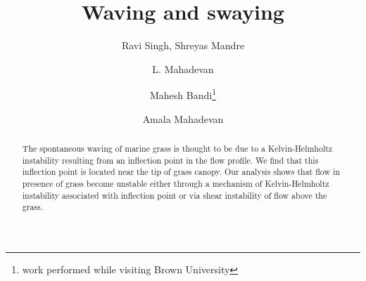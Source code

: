 \documentclass[aps,twocolumn,floatfix,prl,10pt]{revtex4-1}
\begin{document}
\title{Waving and swaying}
\author{Ravi Singh, Shreyas Mandre}
\author{L. Mahadevan}
\author{Mahesh Bandi\footnote{work performed while visiting Brown University}}
\author{Amala Mahadevan}

\begin{abstract}


The spontaneous waving of marine grass is thought to be due to a Kelvin-Helmholtz instability resulting from an inflection point in the flow profile. We find that this inflection point
is located near the tip of grass canopy. Our analysis shows that flow in presence of grass become unstable either through a mechanism of Kelvin-Helmholtz instability associated with 
inflection point or via shear instability of flow above the grass.

\end{abstract}
\maketitle
\end{document}
